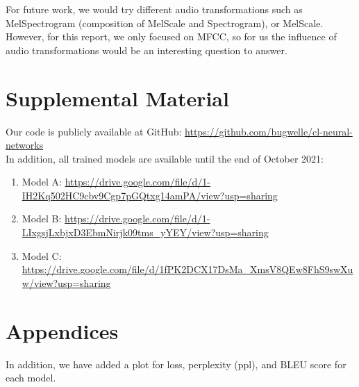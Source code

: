 \documentclass[11pt,a4paper]{article}
\begin{document}
For future work, we would try different audio transformations such as MelSpectrogram (composition of MelScale and Spectrogram), or MelScale. However, for this report, we only focused on MFCC, so for us the influence of audio transformations would be an interesting question to answer.






\appendix

\clearpage

\section{Supplemental Material}
\label{sec:supplemental}

Our code is publicly available at GitHub: \url{https://github.com/bugwelle/cl-neural-networks}\\

In addition, all trained models are available until the end of October 2021:
\begin{enumerate}
    \item Model A: \newline
        \url{https://drive.google.com/file/d/1-IH2Kq502HC9cbv9Cgp7pGQtxg14amPA/view?usp=sharing}
    \item Model B: \newline
        \url{https://drive.google.com/file/d/1-LIxgsjLxbjxD3EbmNirjk09tms_yYEY/view?usp=sharing}
    \item Model C: \newline
        \url{https://drive.google.com/file/d/1fPK2DCX17DsMa_XmsV8QEw8FhS9swXuw/view?usp=sharing}
\end{enumerate}

\section{Appendices}

In addition, we have added a plot for loss, perplexity (ppl), and BLEU score for each model.
\end{document}
